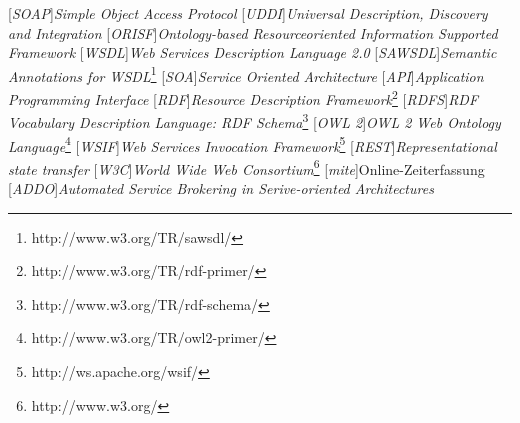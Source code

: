 
[\emph{SOAP}]{\emph{Simple Object Access Protocol}}
[\emph{UDDI}]{\emph{Universal Description, Discovery and Integration}}
[\emph{ORISF}]{\emph{Ontology-based Resourceoriented Information Supported Framework}}
[\emph{WSDL}]{\emph{Web Services Description Language 2.0}}
[\emph{SAWSDL}]{\emph{Semantic Annotations for WSDL}\footnote{http://www.w3.org/TR/sawsdl/}}
[\emph{SOA}]{\emph{Service Oriented Architecture}}
[\emph{API}]{\emph{Application Programming Interface}}
[\emph{RDF}]{\emph{Resource Description Framework}\footnote{http://www.w3.org/TR/rdf-primer/}}
[\emph{RDFS}]{\emph{RDF Vocabulary Description Language: RDF Schema}\footnote{http://www.w3.org/TR/rdf-schema/}}
[\emph{OWL 2}]{\emph{OWL 2 Web Ontology Language}\footnote{http://www.w3.org/TR/owl2-primer/}}
[\emph{WSIF}]{\emph{Web Services Invocation Framework}\footnote{http://ws.apache.org/wsif/}}
[\emph{REST}]{\emph{Representational state transfer}}
[\emph{W3C}]{\emph{World Wide Web Consortium}\footnote{http://www.w3.org/}}
[\emph{mite}]{Online-Zeiterfassung}
[\emph{ADDO}]{\emph{Automated Service Brokering in Serive-oriented Architectures}}


\newcommand{\ws}{Webservice }
\newcommand{\wss}{Webservices }
\newcommand{\restapi}{\emph{RESTful} \ac{API} }
\newcommand{\restapis}{\emph{RESTful} \ac{API}\emph{s} }